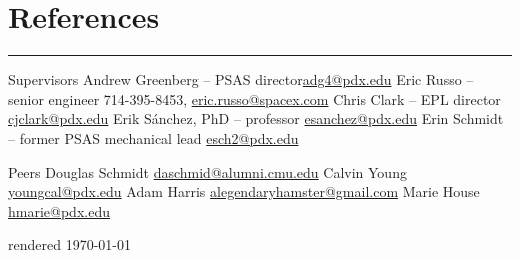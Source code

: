 \section{References}
\noindent\rule{\textwidth}{\hlinewidth}
	\begin{innerlist}
	\item Supervisors
		\subitem Andrew Greenberg -- PSAS director\hfill\href{mailto:adg4@pdx.edu}{adg4@pdx.edu}
		\subitem Eric Russo -- senior engineer \hfill 714-395-8453, \href{mailto:eric.russo@spacex.com}{eric.russo@spacex.com}
		\subitem Chris Clark -- EPL director \hfill\href{mailto:cjclark@pdx.edu}{cjclark@pdx.edu}
		\subitem Erik S\'anchez, PhD -- professor \hfill\href{mailto:esanchez@pdx.edu}{esanchez@pdx.edu}
		\subitem Erin Schmidt -- former PSAS mechanical lead \hfill\href{mailto:esch2@pdx.edu}{esch2@pdx.edu}
	\item Peers
		\subitem Douglas Schmidt \hfill\href{mailto:daschmid@alumni.cmu.edu}{daschmid@alumni.cmu.edu}
		\subitem Calvin Young \hfill\href{mailto:youngcal@pdx.edu}{youngcal@pdx.edu}
		\subitem Adam Harris \hfill\href{mailto:alegendaryhamster@gmail.com}{alegendaryhamster@gmail.com}
		\subitem Marie House \hfill\href{mailto:hmarie@pdx.edu}{hmarie@pdx.edu}
	\end{innerlist}

\vfill
\centering rendered \today


